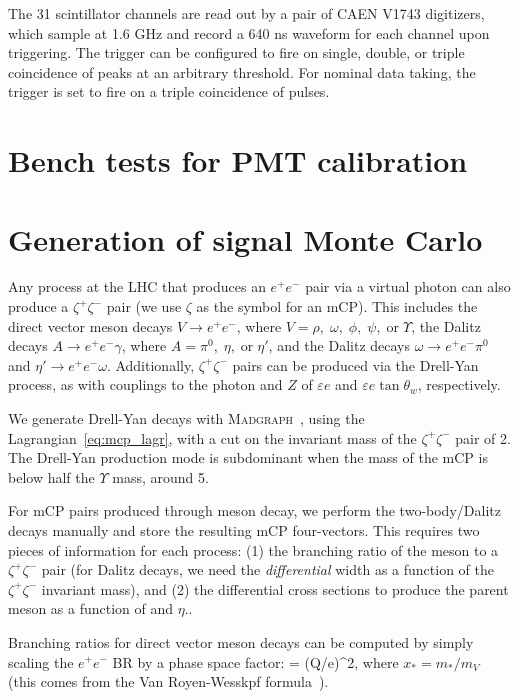 {The 31 scintillator channels are read out by a pair of CAEN V1743 digitizers, which sample at 1.6 GHz
and record a 640 ns waveform for each channel upon triggering. The trigger can be configured
to fire on single, double, or triple coincidence of peaks at an arbitrary threshold.
For nominal data taking, the trigger is set to fire on a triple coincidence of pulses.

\section{Bench tests for PMT calibration}

\section{Generation of signal Monte Carlo}
Any process at the LHC that produces an $e^+e^-$ pair via a virtual
photon can also produce a $\zeta^+\zeta^-$ pair (we use $\zeta$ as the symbol for an mCP).
This includes the direct vector meson decays $V\to e^+e^-$, where 
$V=\rho,\;\omega,\;\phi,\;\psi,\;\text{or}\;\Upsilon$,
the Dalitz decays $A\to e^+e^-\gamma$, where
$A=\pi^0,\;\eta,\;\text{or}\;\eta'$, and the Dalitz decays 
$\omega\to e^+e^-\pi^0$ and $\eta'\to e^+e^-\omega$.
Additionally, $\zeta^+\zeta^-$ pairs can be produced via
the Drell-Yan process, as with couplings to the photon and
$Z$ of $\varepsilon e$ and $\varepsilon e\tan\theta_w$, respectively.

We generate Drell-Yan decays with \textsc{Madgraph}~\cite{madgraph}, using the
Lagrangian~\ref{eq:mcp_lagr}, with a cut on the invariant mass of the $\zeta^+\zeta^-$
pair of 2\GeV. The Drell-Yan production mode is subdominant when the mass of the mCP
is below half the $\Upsilon$ mass, around 5\GeV.

For mCP pairs produced through meson decay, we perform the two-body/Dalitz decays
manually and store the resulting mCP four-vectors. This requires two pieces of
information for each process: (1) the branching ratio of the meson
to a $\zeta^+\zeta^-$ pair (for Dalitz decays, we need the \textit{differential}
width as a function of the $\zeta^+\zeta^-$ invariant mass), and (2)
the differential cross sections to produce the parent meson as a function of \pt and $\eta$..

Branching ratios for direct vector meson decays can be computed by simply
scaling the $e^+e^-$ BR by a phase space factor:
\be
{} = 
(Q/e)^2,
\ee
where $x_*=m_*/m_V$ (this comes from the Van Royen-Wesskpf formula~\cite{vanroyen}).

}
